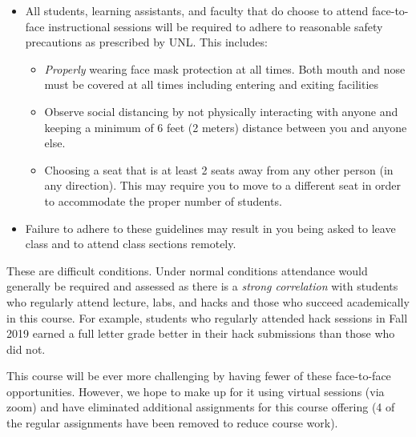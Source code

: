 \documentclass[12pt]{scrartcl}
\begin{document}
\begin{itemize}
  \item All students, learning assistants, and faculty that do choose
  to attend face-to-face instructional sessions will be required to adhere to
  reasonable safety precautions as prescribed by UNL.  This includes:
  \begin{itemize}
    \item \emph{Properly} wearing face mask protection at all
    times.  Both mouth and nose must be covered at all times 
    including entering and exiting facilities
    \item Observe social distancing by not physically interacting with
    anyone and keeping a minimum of 6 feet (2 meters) distance between
    you and anyone else.  
    \item Choosing a seat that is at least
    2 seats away from any other person (in any direction).  This
    may require you to move to a different seat in order to accommodate
    the proper number of students.
  \end{itemize}
  \item Failure to adhere to these guidelines may result in you 
  being asked to leave class and to attend class sections remotely.
\end{itemize}

These are difficult conditions.  Under normal conditions attendance
would generally be required and assessed as there is a 
\emph{strong correlation} with students who regularly 
attend lecture, labs, and hacks and those who succeed academically
in this course.  For example, students who regularly attended hack
sessions in Fall 2019 earned a full letter grade better in their
hack submissions than those who did not.  

This course will be ever more challenging by having fewer of these
face-to-face opportunities.  However, we hope to make up for it using
virtual sessions (via zoom) and have eliminated additional assignments
for this course offering (4 of the regular assignments have been removed
to reduce course work).  


%
\end{document}
